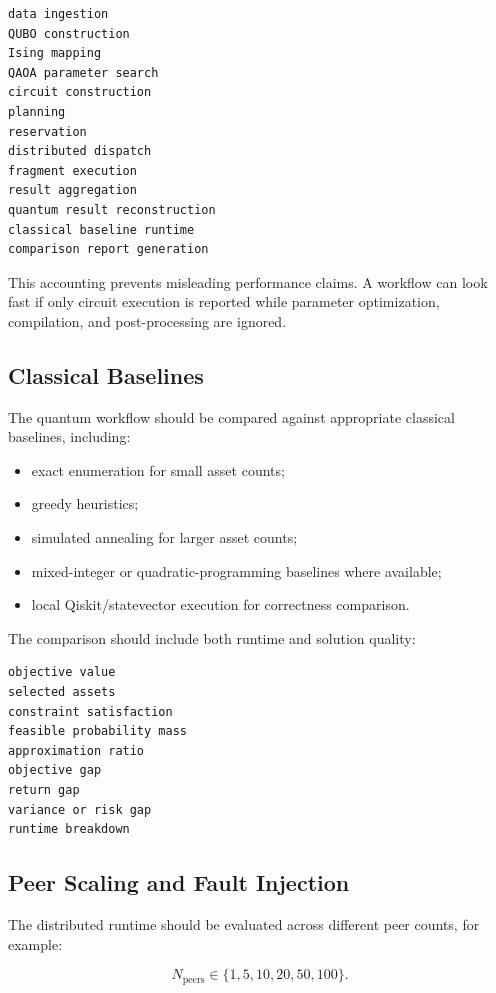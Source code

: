 \documentclass[11pt]{article}
\begin{document}
\begin{lstlisting}[style=codestyle,caption={Workflow sketch.}]
data ingestion
QUBO construction
Ising mapping
QAOA parameter search
circuit construction
planning
reservation
distributed dispatch
fragment execution
result aggregation
quantum result reconstruction
classical baseline runtime
comparison report generation
\end{lstlisting}

This accounting prevents misleading performance claims. A workflow can look fast if only circuit execution is reported while parameter optimization, compilation, and post-processing are ignored.

\subsection{Classical Baselines}

The quantum workflow should be compared against appropriate classical baselines, including:

\begin{itemize}
\item exact enumeration for small asset counts;
\item greedy heuristics;
\item simulated annealing for larger asset counts;
\item mixed-integer or quadratic-programming baselines where available;
\item local Qiskit/statevector execution for correctness comparison.
\end{itemize}

The comparison should include both runtime and solution quality:

\begin{lstlisting}[style=codestyle,caption={Workflow sketch.}]
objective value
selected assets
constraint satisfaction
feasible probability mass
approximation ratio
objective gap
return gap
variance or risk gap
runtime breakdown
\end{lstlisting}

\subsection{Peer Scaling and Fault Injection}

The distributed runtime should be evaluated across different peer counts, for example:

\[
N_{\mathrm{peers}}\in\{1,5,10,20,50,100\}.
\]
\end{document}
